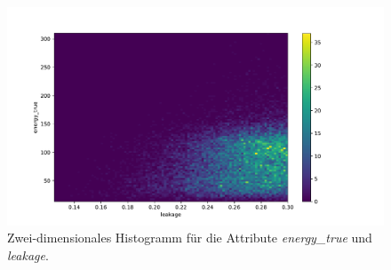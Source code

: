 \documentclass[a4paper, 11pt]{article}
\begin{document}
\begin{figure}[H]
    \centering
    \includegraphics[width=\textwidth]{../A38/A37a_leakage.pdf}
    \caption{Zwei-dimensionales Histogramm für die Attribute \textit{energy\_true} und \textit{leakage}.}
    \label{fig:hist_leackage}
\end{figure}
\end{document}
